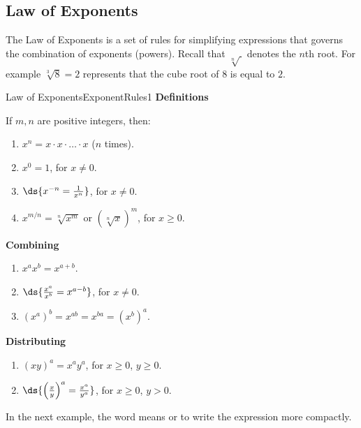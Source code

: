 \subsection{Law of Exponents}
The Law of Exponents is a set of rules for simplifying expressions that governs 
the combination of exponents (powers).
Recall that $\sqrt[n]{~}$ denotes the $n$th root. 
For example $\sqrt[3]{8}=2$ represents that the cube root of $8$ is equal to $2$.\\

\begin{definition}{Law of Exponents}{ExponentRules1}
{\bf Definitions}

If $m,n$ are positive integers, then:
\begin{multicols}{2}
\begin{enumerate}
	\item $x^n=x\cdot x\cdot\ldots\cdot x$ ($n$ times).
	\item $x^0=1$, for $x\neq 0$.
	\item $\ds{x^{-n}=\frac{1}{x^n}}$, for $x\neq 0$.
	\item $x^{m/n}=\sqrt[n]{x^m}$ or $\left(\sqrt[n]{x}\right)^m$, for $x\geq 0$.
\end{enumerate}
\end{multicols}

{\bf Combining}
\begin{multicols}{3}
\begin{enumerate}
	\item $x^ax^b=x^{a+b}$.
	\item $\ds{\frac{x^a}{x^b}=x^{a-b}}$, for $x\neq 0$.
	\item $\left(x^a\right)^b=x^{ab}=x^{ba}=\left(x^b\right)^a$.
\end{enumerate}
\end{multicols}

{\bf Distributing}
\begin{multicols}{2}
\begin{enumerate}
	\item $(xy)^a=x^ay^a$, for $x\geq 0$, $y\geq 0$.
	\item $\ds{\left(\frac{x}{y}\right)^a=\frac{x^a}{y^a}}$, for $x\geq 0$, $y>0$.
\end{enumerate}
\end{multicols}
\end{definition}

In the next example, the word  means  or to write the expression more compactly.\\

